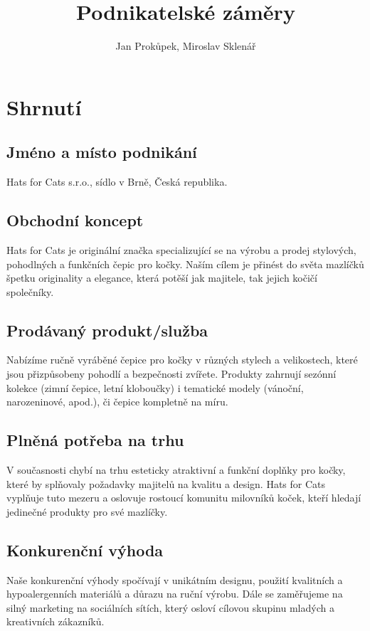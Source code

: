 \documentclass[12pt, a4paper]{article}
\begin{document}
\nocite{csob-podnikatelsky-plan}
\author{Jan Prokůpek, Miroslav Sklenář}
\title{\textbf{Podnikatelské záměry}}
\date{}

\maketitle

\pagebreak

\tableofcontents

\pagebreak

\section{Shrnutí}

\subsection{Jméno a místo podnikání}
Hats for Cats s.r.o., sídlo v Brně, Česká republika.

\subsection{Obchodní koncept}
Hats for Cats je originální značka specializující se na výrobu a prodej stylových, pohodlných a funkčních čepic pro kočky. 
Naším cílem je přinést do světa mazlíčků špetku originality a elegance, která potěší jak majitele, tak jejich kočičí společníky.

\subsection{Prodávaný produkt/služba}
Nabízíme ručně vyráběné čepice pro kočky v různých stylech a velikostech, 
které jsou přizpůsobeny pohodlí a bezpečnosti zvířete. 
Produkty zahrnují sezónní kolekce (zimní čepice, letní kloboučky) i tematické modely (vánoční, narozeninové, apod.),
či čepice kompletně na míru.

\subsection{Plněná potřeba na trhu}
V současnosti chybí na trhu esteticky atraktivní a funkční doplňky pro kočky, které by splňovaly požadavky majitelů na kvalitu a design. Hats for Cats vyplňuje tuto mezeru a oslovuje rostoucí komunitu milovníků koček, kteří hledají jedinečné produkty pro své mazlíčky.

\subsection{Konkurenční výhoda}
Naše konkurenční výhody spočívají v unikátním designu, použití kvalitních a hypoalergenních materiálů a důrazu na ruční výrobu. Dále se zaměřujeme na silný marketing na sociálních sítích, který osloví cílovou skupinu mladých a kreativních zákazníků.
\end{document}
